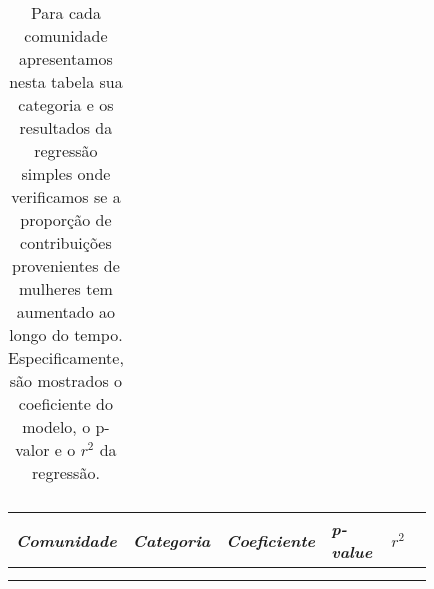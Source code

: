 \begin{longtabu}{@{}
	p{0.2\linewidth}
	p{0.2\linewidth}
	P{0.15\linewidth}
	P{0.15\linewidth}
	P{0.13\linewidth}@{}}
\caption[Sumário das contribuições ao longo do tempo]{Para cada comunidade apresentamos nesta tabela sua categoria e os resultados da regressão simples onde verificamos se a proporção de contribuições provenientes de mulheres tem aumentado ao longo do tempo. Especificamente, são mostrados o coeficiente do modelo, o p-valor e o $r^2$ da regressão.}
\end{longtabu}

\small
\begin{longtabu}{@{}
	p{0.2\linewidth}
	p{0.2\linewidth}
	P{0.15\linewidth}
	P{0.15\linewidth}
	P{0.13\linewidth}@{}}
\toprule
\textit{Comunidade}        & \textit{Categoria}           & \textit{Coeficiente} & \textit{p-value} & $r^2$ \\ \midrule
\endhead

\\ \hline
\endfoot


\end{longtabu}
